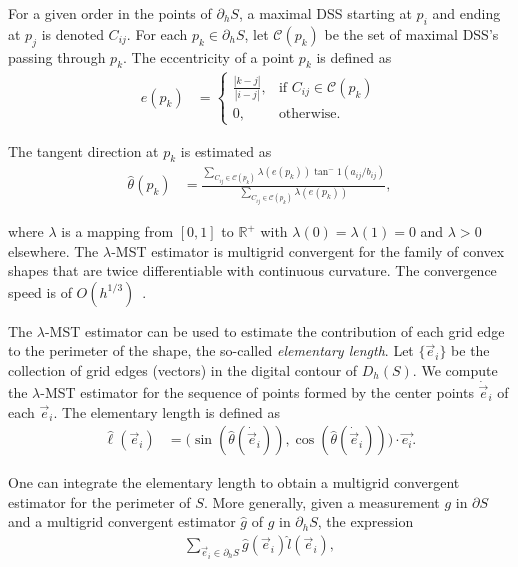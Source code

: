 For a given order in the points of $\partial_h S$, a maximal DSS starting at $p_i$ and ending at $p_j$ is denoted $C_{ij}$. For each $p_k \in \partial_h S$, let $\mathcal{C}(p_k)$ be the set of maximal DSS's passing through $p_k$. The eccentricity of a point $p_k$ is defined as
\begin{align*}
	e(p_k) &= \left\{ \begin{array}{cc}
	\frac{|k-j|}{|i-j|}, & \text{if } C_{ij} \in \mathcal{C}(p_k) \\
	0, & \text{otherwise}.
	\end{array}\right.
\end{align*}

The tangent direction at $p_k$ is estimated as
\begin{align*}
	\hat{\theta}(p_k) &= \frac{ \sum_{C_{ij} \in \mathcal{C}(p_k) }{ \lambda( e(p_k) ) \tan^-1(a_{ij}/b_{ij}) } }{ \sum_{C_{ij} \in \mathcal{C}(p_k) }{ \lambda( e(p_k) )} },
\end{align*}

where $\lambda$ is a mapping from $[0,1]$ to $\mathbb{R}^+$ with $\lambda(0)=\lambda(1)=0$ and $\lambda > 0$ elsewhere. The $\lambda$-MST estimator is multigrid convergent for the family of convex shapes that are twice differentiable with continuous curvature. The convergence speed is of $O(h^{1/3})$~\cite{lachaud07tangent}.

The $\lambda$-MST estimator can be used to estimate the contribution of each grid edge to the perimeter of the shape, the so-called \emph{elementary length}. Let $\{\vec{e}_i\}$ be the collection of grid edges (vectors) in the digital contour of $D_h(S)$. We compute the $\lambda$-MST estimator for the sequence of points formed by the center points $\dot{\vec{e}}_i$ of each $\vec{e}_i$. The elementary length is defined as
\begin{align*}
\hat{\ell}(\vec{e}_i) &= \big( \sin( \hat{\theta}(\dot{\vec{e}}_i) ), \cos( \hat{\theta}(\dot{\vec{e}}_i) ) \big) \cdot \vec{e_i}.
\end{align*}

One can integrate the elementary length to obtain a multigrid convergent estimator for the perimeter of $S$. More generally, given a measurement $g$ in $\partial S$ and a multigrid convergent estimator $\hat{g}$ of $g$ in $\partial_h S$, the expression
\begin{align*}
	\sum_{\vec{e}_i \in \partial_h S}{ \hat{g}(\vec{e}_i) \hat{l}(\vec{e}_i)},
\end{align*}

